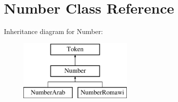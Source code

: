 \hypertarget{class_number}{}\section{Number Class Reference}
\label{class_number}
Inheritance diagram for Number\+:\begin{figure}[H]
\begin{center}
\leavevmode
\includegraphics[height=3.000000cm]{class_number}
\end{center}
\end{figure}
